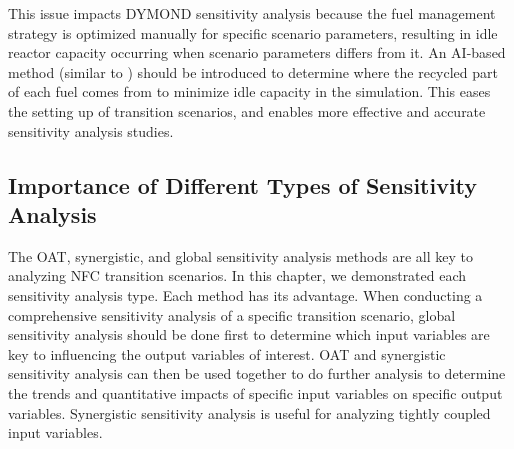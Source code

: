 This issue impacts DYMOND sensitivity analysis 
because the fuel management strategy is 
optimized manually for specific scenario parameters, resulting in 
idle reactor capacity occurring when scenario parameters differs 
from it. 
An AI-based method (similar to \deploy) 
should be introduced to 
determine where the recycled part of each fuel comes from to 
minimize idle capacity in the simulation. 
This eases the setting up of transition scenarios, and enables 
more effective and accurate sensitivity analysis studies.

\subsection{Importance of Different Types of Sensitivity Analysis}
The OAT, synergistic, and global sensitivity analysis methods 
are all key to analyzing \gls{NFC} transition scenarios. 
In this chapter, we demonstrated each sensitivity analysis type. 
Each method has its advantage. 
When conducting a comprehensive sensitivity analysis of a specific 
transition scenario, 
global sensitivity analysis should be done first to 
determine which input variables are key to influencing the output 
variables of interest. 
OAT and synergistic sensitivity analysis can then be used together to 
do further analysis to determine the trends and quantitative impacts 
of specific input variables on specific output variables. 
Synergistic sensitivity analysis is useful for analyzing 
tightly coupled input variables.  
